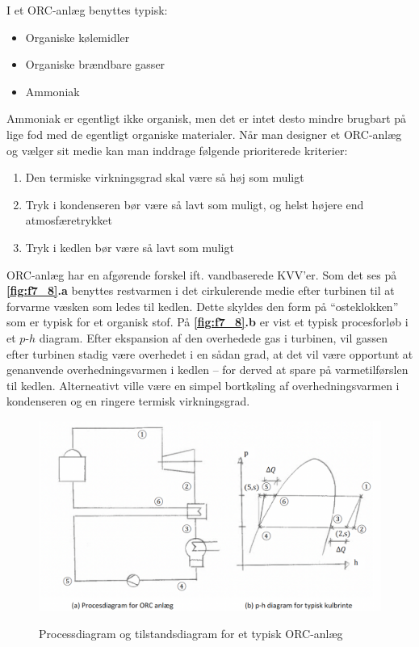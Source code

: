 I et ORC-anlæg benyttes typisk:
\begin{itemize}
  \item Organiske kølemidler
  \item Organiske brændbare gasser
  \item Ammoniak
\end{itemize}
Ammoniak er egentligt ikke organisk, men det er intet desto mindre brugbart på lige fod med de egentligt organiske materialer. Når man designer et ORC-anlæg og vælger sit medie kan man inddrage følgende prioriterede kriterier:
\begin{enumerate}
  \item Den termiske virkningsgrad skal være så høj som muligt
  \item Tryk i kondenseren bør være så lavt som muligt, og helst højere end atmosfæretrykket
  \item Tryk i kedlen bør være så lavt som muligt
\end{enumerate}

ORC-anlæg har en afgørende forskel ift. vandbaserede KVV'er. Som det ses på \textbf{\autoref{fig:f7_8}.a} benyttes restvarmen i det cirkulerende medie efter turbinen til at forvarme væsken som ledes til kedlen. Dette skyldes den form på ``osteklokken'' som er typisk for et organisk stof. På \textbf{\autoref{fig:f7_8}.b} er vist et typisk procesforløb i et $p$-$h$ diagram. Efter ekspansion af den overhedede gas i turbinen, vil gassen efter turbinen stadig være overhedet i en sådan grad, at det vil være opportunt at genanvende overhedningsvarmen i kedlen -- for derved at spare på varmetilførslen til kedlen. Alterneativt ville være en simpel bortkøling af overhedningsvarmen i kondenseren og en ringere termisk virkningsgrad.

\begin{figure} [ht]
  \centering
  \caption{Processdiagram og tilstandsdiagram for et typisk ORC-anlæg}
  \includegraphics[width=0.5\linewidth]{./figures/f7_8.png}
  \label{fig:f7_8}
\end{figure}


